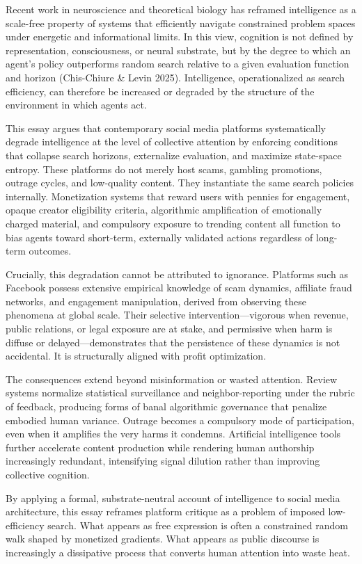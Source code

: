 \documentclass[12pt]{article}
\begin{document}
Recent work in neuroscience and theoretical biology has reframed intelligence as a scale-free property of systems that efficiently navigate constrained problem spaces under energetic and informational limits. In this view, cognition is not defined by representation, consciousness, or neural substrate, but by the degree to which an agent’s policy outperforms random search relative to a given evaluation function and horizon (Chis-Chiure \& Levin 2025). Intelligence, operationalized as search efficiency, can therefore be increased or degraded by the structure of the environment in which agents act.

This essay argues that contemporary social media platforms systematically degrade intelligence at the level of collective attention by enforcing conditions that collapse search horizons, externalize evaluation, and maximize state-space entropy. These platforms do not merely host scams, gambling promotions, outrage cycles, and low-quality content. They instantiate the same search policies internally. Monetization systems that reward users with pennies for engagement, opaque creator eligibility criteria, algorithmic amplification of emotionally charged material, and compulsory exposure to trending content all function to bias agents toward short-term, externally validated actions regardless of long-term outcomes.

Crucially, this degradation cannot be attributed to ignorance. Platforms such as Facebook possess extensive empirical knowledge of scam dynamics, affiliate fraud networks, and engagement manipulation, derived from observing these phenomena at global scale. Their selective intervention—vigorous when revenue, public relations, or legal exposure are at stake, and permissive when harm is diffuse or delayed—demonstrates that the persistence of these dynamics is not accidental. It is structurally aligned with profit optimization.

The consequences extend beyond misinformation or wasted attention. Review systems normalize statistical surveillance and neighbor-reporting under the rubric of feedback, producing forms of banal algorithmic governance that penalize embodied human variance. Outrage becomes a compulsory mode of participation, even when it amplifies the very harms it condemns. Artificial intelligence tools further accelerate content production while rendering human authorship increasingly redundant, intensifying signal dilution rather than improving collective cognition.

By applying a formal, substrate-neutral account of intelligence to social media architecture, this essay reframes platform critique as a problem of imposed low-efficiency search. What appears as free expression is often a constrained random walk shaped by monetized gradients. What appears as public discourse is increasingly a dissipative process that converts human attention into waste heat.
\end{document}
